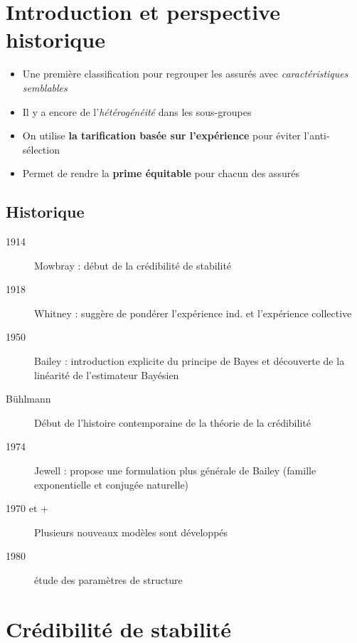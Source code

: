 \documentclass[10pt, french]{article}
\begin{document}
\begin{multicols*}{3} %
\section{Introduction et perspective historique}
\begin{itemize}
\item Une première classification pour regrouper les assurés avec \emph{caractéristiques semblables}
\item Il y a encore de l'\emph{hétérogénéité} dans les sous-groupes
\item On utilise \textbf{la tarification basée sur l'expérience} pour éviter l'anti-sélection
\item Permet de rendre la \textbf{prime équitable} pour chacun des assurés
\end{itemize}

\subsection*{Historique}
\begin{description}
\item[1914] Mowbray : début de la crédibilité de stabilité
\item[1918] Whitney : suggère de pondérer l'expérience ind. et l'expérience collective
\item[1950] Bailey : introduction explicite du principe de Bayes et découverte de la linéarité de l'estimateur Bayésien
\item[Bühlmann] Début de l'histoire contemporaine de la théorie de la crédibilité

\item[1974] Jewell : propose une formulation plus générale de Bailey (famille exponentielle et conjugée naturelle)
\item[1970 et +] Plusieurs nouveaux modèles sont développés
  \item[1980] étude des paramètres de structure
\end{description}





\section{Crédibilité de stabilité}

\end{multicols*}
\end{document}
